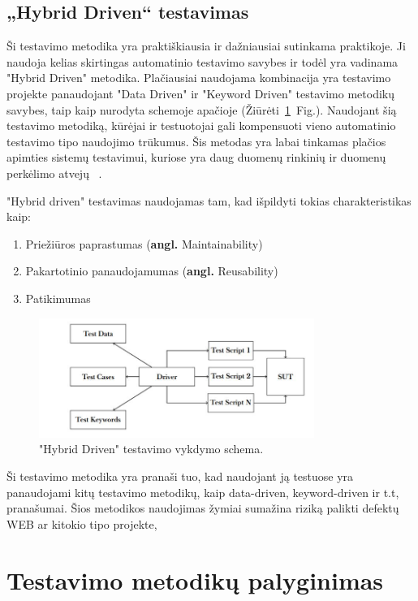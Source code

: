 \documentclass[a4paper,12pt,fleqn]{article}
\begin{document}
\newpage
\subsection{„Hybrid Driven“ testavimas}
Ši testavimo metodika yra praktiškiausia ir dažniausiai sutinkama praktikoje. Ji naudoja kelias skirtingas automatinio testavimo savybes ir todėl yra vadinama "Hybrid Driven" metodika. Plačiausiai naudojama kombinacija yra testavimo projekte panaudojant "Data Driven" ir "Keyword Driven" testavimo metodikų savybes, taip kaip nurodyta schemoje apačioje (Žiūrėti\ \ref{fig:hybrid}~Fig.). Naudojant šią testavimo metodiką, kūrėjai ir testuotojai gali kompensuoti vieno automatinio testavimo tipo naudojimo trūkumus. Šis metodas yra labai tinkamas plačios apimties sistemų testavimui, kuriose yra daug duomenų rinkinių ir duomenų perkėlimo atvejų ~\cite{inproceedings}.

"Hybrid driven" testavimas naudojamas tam, kad išpildyti tokias charakteristikas kaip:
\begin{enumerate}
    \item Priežiūros paprastumas (\textbf{angl.} Maintainability)
    \item Pakartotinio panaudojamumas (\textbf{angl.} Reusability)
    \item Patikimumas
\end{enumerate}
\newline
\begin{figure}[h]
    \centering
    \includegraphics[width=0.8\textwidth]{Hybrid.JPG}
    \caption{"Hybrid Driven" testavimo vykdymo schema.}
    \label{fig:hybrid}
\end{figure}

Ši testavimo metodika yra pranaši tuo, kad naudojant ją testuose yra panaudojami kitų testavimo metodikų, kaip data-driven, keyword-driven ir t.t, pranašumai. Šios metodikos naudojimas žymiai sumažina riziką palikti defektų WEB ar kitokio tipo projekte,

\newpage
\section{Testavimo metodikų palyginimas}
\end{document}
